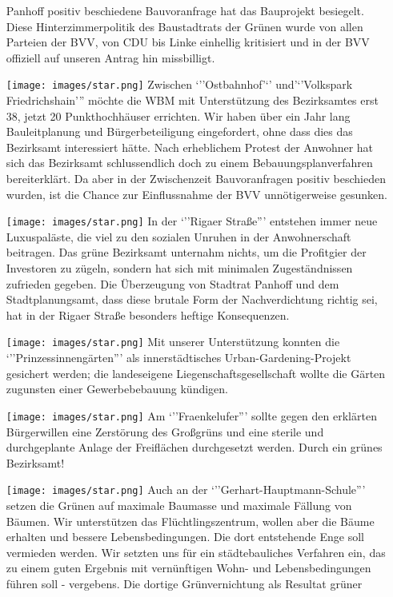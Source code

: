 \documentclass[a4paper,10pt]{article}
\begin{document}
\begin{itemize}
  Panhoff positiv beschiedene Bauvoranfrage hat das Bauprojekt
  besiegelt. Diese Hinterzimmerpolitik des Baustadtrats der Grünen wurde
  von allen Parteien der BVV, von CDU bis Linke einhellig kritisiert und
  in der BVV offiziell auf unseren Antrag hin missbilligt.
\item[\texttt{[image: images/star.png]}]
  Zwischen `''Ostbahnhof'`' und'`'Volkspark Friedrichshain''' möchte die
  WBM mit Unterstützung des Bezirksamtes erst 38, jetzt 20
  Punkthochhäuser errichten. Wir haben über ein Jahr lang Bauleitplanung
  und Bürgerbeteiligung eingefordert, ohne dass dies das Bezirksamt
  interessiert hätte. Nach erheblichem Protest der Anwohner hat sich das
  Bezirksamt schlussendlich doch zu einem Bebauungsplanverfahren
  bereiterklärt. Da aber in der Zwischenzeit Bauvoranfragen positiv
  beschieden wurden, ist die Chance zur Einflussnahme der BVV
  unnötigerweise gesunken.
\item[\texttt{[image: images/star.png]}]
  In der `''Rigaer Straße''' entstehen immer neue Luxuspaläste, die viel
  zu den sozialen Unruhen in der Anwohnerschaft beitragen. Das grüne
  Bezirksamt unternahm nichts, um die Profitgier der Investoren zu
  zügeln, sondern hat sich mit minimalen Zugeständnissen zufrieden
  gegeben. Die Überzeugung von Stadtrat Panhoff und dem
  Stadtplanungsamt, dass diese brutale Form der Nachverdichtung richtig
  sei, hat in der Rigaer Straße besonders heftige Konsequenzen.
\item[\texttt{[image: images/star.png]}]
  Mit unserer Unterstützung konnten die `''Prinzessinnengärten''' als
  innerstädtisches Urban-Gardening-Projekt gesichert werden; die
  landeseigene Liegenschaftsgesellschaft wollte die Gärten zugunsten
  einer Gewerbebebauung kündigen.
\item[\texttt{[image: images/star.png]}]
  Am `''Fraenkelufer''' sollte gegen den erklärten Bürgerwillen eine
  Zerstörung des Großgrüns und eine sterile und durchgeplante Anlage der
  Freiflächen durchgesetzt werden. Durch ein grünes Bezirksamt!
\item[\texttt{[image: images/star.png]}]
  Auch an der `''Gerhart-Hauptmann-Schule''' setzen die Grünen auf
  maximale Baumasse und maximale Fällung von Bäumen. Wir unterstützen
  das Flüchtlingszentrum, wollen aber die Bäume erhalten und bessere
  Lebensbedingungen. Die dort entstehende Enge soll vermieden werden.
  Wir setzten uns für ein städtebauliches Verfahren ein, das zu einem
  guten Ergebnis mit vernünftigen Wohn- und Lebensbedingungen führen
  soll - vergebens. Die dortige Grünvernichtung als Resultat grüner

\end{itemize}
\end{document}
